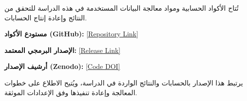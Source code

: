 
\begin{tcolorbox}[
  colback=gray!5,
  colframe=black!70,
  title={\textbf{إعادة الإنتاج والمواد الحسابية (Reproducibility and Computational Materials)}},
  fonttitle=\bfseries,
  breakable,
  left=4mm, right=4mm, top=3mm, bottom=3mm
]

تُتاح الأكواد الحسابية ومواد معالجة البيانات المستخدمة في هذه الدراسة للتحقق من النتائج وإعادة إنتاج الحسابات.

\vspace{1mm}
\noindent\textbf{مستودع الأكواد (GitHub):} \url{[Repository Link]}

\vspace{1mm}
\noindent\textbf{الإصدار البرمجي المعتمد:} \url{[Release Link]}

\vspace{1mm}
\noindent\textbf{أرشيف الإصدار (Zenodo):} \url{[Code DOI]}

\vspace{1mm}
يرتبط هذا الإصدار بالحسابات والنتائج الواردة في الدراسة، ويُتيح الاطلاع على خطوات المعالجة وإعادة تنفيذها وفق الإعدادات الموثقة.

\end{tcolorbox}

